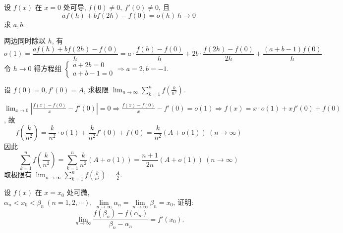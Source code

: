 \begin{example}
    设 $f(x)$ 在 $x=0$ 处可导, $f(0)\neq0,~f'(0)\neq 0$, 且 $$af(h)+bf(2h)-f(0)=o(h)~  h\to0$$
    求 $a,b.$
\end{example}
\begin{solution}
    两边同时除以 $h$, 有
    $$o(1)=\dfrac{af(h)+bf(2h)-f(0)}{h}=a\cdot\dfrac{f(h)-f(0)}{h}+2b\cdot\dfrac{f(2h)-f(0)}{2h}+\dfrac{(a+b-1)f(0)}{h}$$
    令 $h\to0$ 得方程组 $\begin{cases}
            a+2b=0 \\a+b-1=0
        \end{cases}\Rightarrow a=2,b=-1.$
\end{solution}

\begin{example}
    设 $f(0)=0,f'(0)=A$, 求极限 $\displaystyle\lim_{n\to\infty}\sum_{k=1}^{n}f\left(\frac{k}{n^2}\right).$
\end{example}
\begin{solution}
    $\displaystyle\lim_{x\to0}\left|\frac{f(x)-f(0)}{x}-f'(0)\right|=0\Rightarrow\frac{f(x)-f(0)}{x}-f'(0)=o(1)\Rightarrow f(x)=x\cdot o(1)+xf'(0)+f(0)$, 故
    $$f\left(\frac{k}{n^2}\right)=\frac{k}{n^2}\cdot o(1)+\frac{k}{n^2} f'(0)+f(0)=\frac{k}{n^2}(A+o(1))~  (n\to\infty)$$
    因此 $$\sum_{k=1}^{n}f\left(\frac{k}{n^2}\right)=\sum_{k=1}^{n}\frac{k}{n^2}(A+o(1))=\frac{n+1}{2n}(A+o(1))~  (n\to\infty)$$
    取极限有 $\displaystyle\lim_{n\to\infty}\sum_{k=1}^{n}f\left(\frac{k}{n^2}\right)=\frac{A}{2}.$
\end{solution}
\begin{example}
    设 $f(x)$ 在 $x=x_0$ 处可微, $\alpha_n<x_0<\beta_n~  (n=1,2,\cdots),~\lim\limits_{n\to\infty}\alpha_n=\lim\limits_{n\to\infty}\beta_n=x_0$,
    证明: $$\lim\limits_{n\to\infty}\dfrac{f(\beta_n)-f(\alpha_n)}{\beta_n-\alpha_n}=f'(x_0).$$
\end{example}
